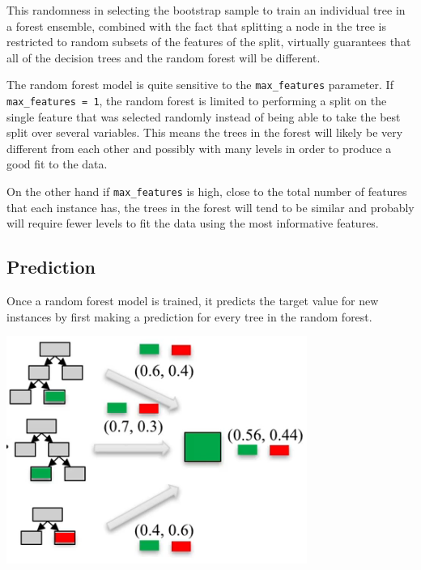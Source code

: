 This randomness in selecting the bootstrap sample to train an individual tree in a forest ensemble, combined with the fact that splitting a node in the tree is restricted to random subsets of the features of the split, virtually guarantees that all of the decision trees and the random forest will be different. 

The random forest model is quite sensitive to the \texttt{max_features} parameter. If \texttt{max_features = 1}, the random forest is limited to performing a split on the single feature that was selected randomly instead of being able to take the best split over several variables. This means the trees in the forest will likely be very different from each other and possibly with many levels in order to produce a good fit to the data. 

On the other hand if \texttt{max_features} is high, close to the total number of features that each instance has, the trees in the forest will tend to be similar and probably will require fewer levels to fit the data using the most informative features. 

\subsection{Prediction}

Once a random forest model is trained, it predicts the target value for new instances by first making a prediction for every tree in the random forest. 

\begin{center}
	\includegraphics[width=\linewidth]{img/Random-Forest-Prediction.png} 
\end{center}

